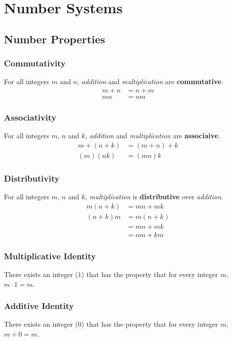 \documentclass[../notes.tex]{subfiles}
\begin{document}
	\chapter{Number Systems}
		\section{Number Properties}
			\subsection{Commutativity}
				For all integers $m$ and $n$, \textit{addition} and \textit{multiplication} are \textbf{commutative}.
				\nopagebreak
				\begin{align*}
					m + n &= n + m \tag*{addition}\\
					mn &= nm \tag*{multiplication}
				\end{align*}
			\subsection{Associativity}
				For all integers $m$, $n$ and $k$, \textit{addition} and \textit{multiplication} are \textbf{associaive}.
				\nopagebreak
				\begin{align*}
					m+(n+k) &= (m+n)+k \tag*{addition}\\
					(m)(nk) &= (mn)k \tag*{multiplication}
				\end{align*}
			\subsection{Distributivity}
				For all integers $m$, $n$ and $k$, \textit{multiplication} is \textbf{distributive} over \textit{addition}.
				\nopagebreak
				\begin{align*}
					m(n + k) &= mn + mk\\
					(n + k)m &= m(n + k)\\
					&= mn + mk\\
					&= nm + km
				\end{align*}
			\subsection{Multiplicative Identity}
				There exists an integer ($1$) that has the property that for every integer $m$, $m\cdot 1 = m$.
			\subsection{Additive Identity}
				There exists an integer ($0$) that has the property that for every integer $m$, $m + 0 = m$.
\end{document}

